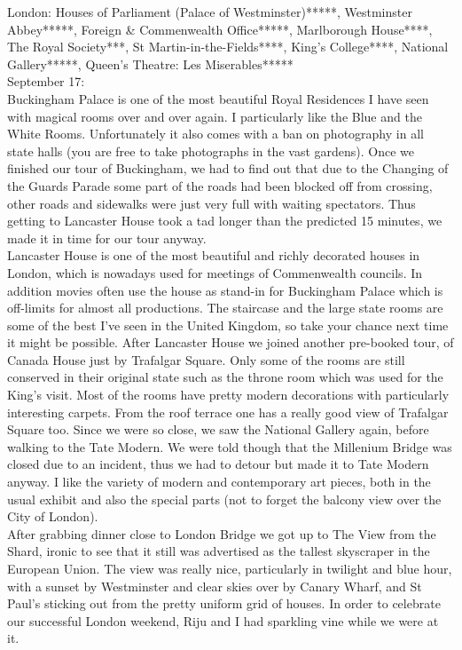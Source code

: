 London: Houses of Parliament (Palace of Westminster)*****, Westminster Abbey*****, Foreign \& Commenwealth Office*****, Marlborough House****, The Royal Society***, St Martin-in-the-Fields****, King's College****, National Gallery*****, Queen's Theatre: Les Miserables*****\\

September 17:\\
Buckingham Palace is one of the most beautiful Royal Residences I have seen with magical rooms over and over again. I particularly like the Blue and the White Rooms. Unfortunately it also comes with a ban on photography in all state halls (you are free to take photographs in the vast gardens).  Once we finished our tour of Buckingham, we had to find out that due to the Changing of the Guards Parade some part of the roads had been blocked off from crossing, other roads and sidewalks were just very full with waiting spectators. Thus getting to Lancaster House took a tad longer than the predicted 15 minutes, we made it in time for our tour anyway. \\
Lancaster House is one of the most beautiful and richly decorated houses in London, which is nowadays used for meetings of Commenwealth councils. In addition movies often use the house as stand-in for Buckingham Palace which is off-limits for almost all productions. The staircase and the large state rooms are some of the best I've seen in the United Kingdom, so take your chance next time it might be possible. After Lancaster House we joined another pre-booked tour, of Canada House just by Trafalgar Square. Only some of the rooms are still conserved in their original state such as the throne room which was used for the King's visit. Most of the rooms have pretty modern decorations with particularly interesting carpets. From the roof terrace one has a really good view of Trafalgar Square too. Since we were so close, we saw the National Gallery again, before walking to the Tate Modern. We were told though that the Millenium Bridge was closed due to an incident, thus we had to detour but made it to Tate Modern anyway. I like the variety of modern and contemporary art pieces, both in the usual exhibit and also the special parts (not to forget the balcony view over the City of London). \\
After grabbing dinner close to London Bridge we got up to The View from the Shard, ironic to see that it still was advertised as the tallest skyscraper in the European Union. The view was really nice, particularly in twilight and blue hour, with a sunset by Westminster and clear skies over by Canary Wharf, and St Paul's sticking out from the pretty uniform grid of houses. In order to celebrate our successful London weekend, Riju and I had sparkling vine while we were at it.\\

